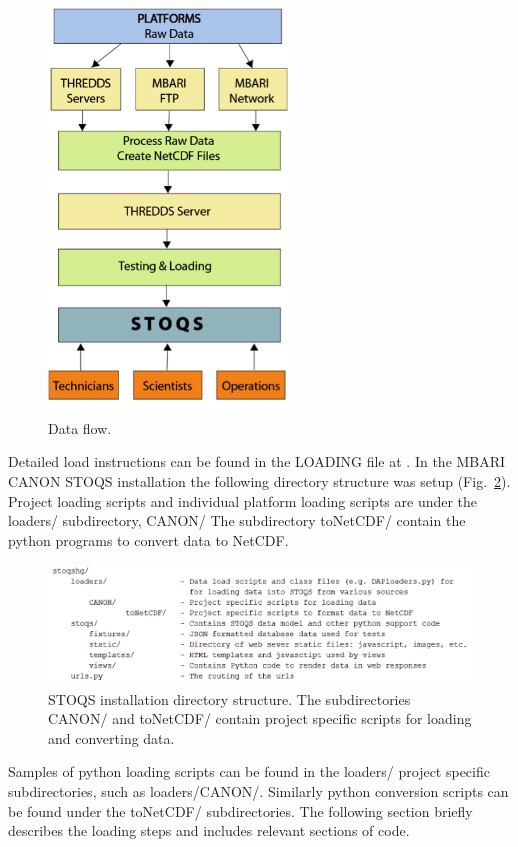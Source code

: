 \begin{figure}[htbp]
\centering
\includegraphics[width=2.5in]{ReikoFigure2.png}
\caption{Data flow.}
\label{fig:ReikoFigure2}
\end{figure}

Detailed load instructions can be found in the LOADING file at \cite{STOQS}.  In the MBARI CANON STOQS installation the following directory structure was setup (Fig.~\ref{fig:ReikoFigure3}).  Project loading scripts and individual platform loading scripts are under the loaders/ subdirectory,  CANON/ The subdirectory toNetCDF/ contain the python programs to convert data to NetCDF.  

\begin{figure}[htbp]
\centering
\includegraphics[width=5.0in]{ReikoFigure3.png}
\caption{STOQS installation directory structure. The subdirectories CANON/ and toNetCDF/ contain project specific  scripts for loading and converting data.}
\label{fig:ReikoFigure3}
\end{figure}

Samples of python loading scripts can be found in the loaders/ project specific subdirectories, such as loaders/CANON/. Similarly python conversion scripts can be found under the toNetCDF/ subdirectories.  The following section briefly describes the loading steps and includes relevant sections of code. 


